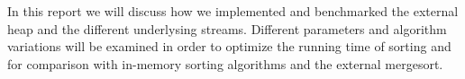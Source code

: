 In this report we will discuss how we implemented and benchmarked the external heap and the different underlysing streams. Different parameters and algorithm variations will be examined in order to optimize the running time of sorting and for comparison with in-memory sorting algorithms and the external mergesort.